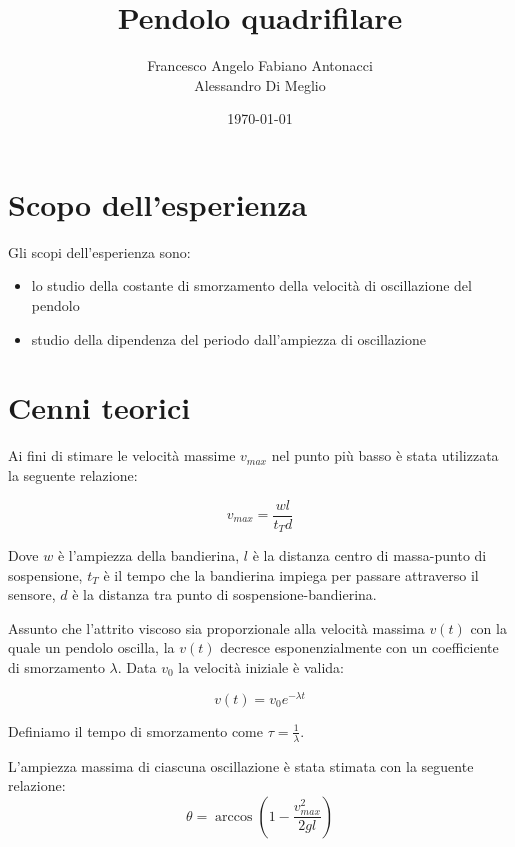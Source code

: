 \documentclass{article}
\title{Pendolo quadrifilare}
\author{Francesco Angelo Fabiano Antonacci \\ Alessandro Di Meglio}
\date{\today}
\begin{document}
\maketitle
\section{Scopo dell'esperienza}
Gli scopi dell'esperienza sono:

\begin{itemize}
\item lo studio della costante di smorzamento della velocità di oscillazione del pendolo 
\item studio della dipendenza del periodo dall'ampiezza di oscillazione
\end{itemize}




\section{Cenni teorici}

Ai fini di stimare le velocità massime $v_{max}$ nel punto più basso è stata utilizzata la seguente relazione:

\begin{equation}
v_{max}= \frac{w l}{t_T d}
\label{eq:vmax}
\end{equation}

Dove $w$ è l'ampiezza della bandierina, $l$ è la distanza centro di massa-punto di sospensione, $t_T$ è il tempo che la bandierina impiega per passare attraverso il sensore, $d$ è la distanza tra punto di sospensione-bandierina.




Assunto che l'attrito viscoso sia proporzionale alla velocità massima $v(t)$ con la quale un pendolo oscilla, la $v(t)$  decresce esponenzialmente con un coefficiente di smorzamento $\lambda$. Data $v_0$ la velocità iniziale è valida:  

\begin{equation}
v(t) = v_0 e^{-\lambda t}
\label{eq:vt}
\end{equation}

Definiamo il tempo di smorzamento come $\tau=\frac{1}{\lambda}$.

L'ampiezza massima  di ciascuna oscillazione è stata stimata con la seguente relazione:
\begin{equation}
\theta = \arccos(1-\frac{v_{max}^2}{2gl})
\label{eq:thmax}
\end{equation}
\end{document}
